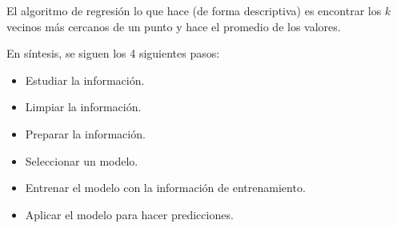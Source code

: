 \documentclass[12pt]{report}
\newcounter{it}
\theoremstyle{largebreak}
\begin{document}
\begin{sol}
        El algoritmo de regresión lo que hace (de forma descriptiva) es encontrar los $k$ vecinos más cercanos de un punto y hace el promedio de los valores.

    \end{sol}
    
    En síntesis, se siguen los 4 siguientes pasos:

    \begin{itemize}
        \item Estudiar la información.
        \item Limpiar la información.
        \item Preparar la información.
        \item Seleccionar un modelo.
        \item Entrenar el modelo con la información de entrenamiento.
        \item Aplicar el modelo para hacer predicciones.
    \end{itemize}
\end{document}
